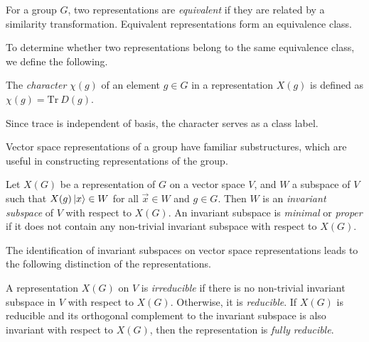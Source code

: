 \begin{definition}
    For a group $G$, two representations are \textit{equivalent} if they are related by a similarity transformation. Equivalent representations form an equivalence class.
\end{definition}

To determine whether two representations belong to the same equivalence class, we define the following.
\begin{definition}
    The \textit{character} $\chi(g)$ of an element $g\in G$ in a representation $X(g)$ is defined as $\chi(g) = \text{Tr}~D(g)$.
\end{definition}
Since trace is independent of basis, the character serves as a class label.

Vector space representations of a group have familiar substructures, which are useful in constructing representations of the group.
\begin{definition}
    Let $X(G)$ be a representation of $G$ on a vector space $V$, and $W$ a subspace of $V$ such that $X(g)\ket{x}\in W$ for all $\vec{x}\in W$ and $g\in G$. Then $W$ is an \textit{invariant subspace} of $V$ with respect to $X(G)$. An invariant subspace is \textit{minimal} or \textit{proper} if it does not contain any non-trivial invariant subspace with respect to $X(G)$.
\end{definition}

The identification of invariant subspaces on vector space representations leads to the following distinction of the representations.
\begin{definition}
    A representation $X(G)$ on $V$ is \textit{irreducible} if there is no non-trivial invariant subspace in $V$ with respect to $X(G)$. Otherwise, it is \textit{reducible}. If $X(G)$ is reducible and its orthogonal complement to the invariant subspace is also invariant with respect to $X(G)$, then the representation is \textit{fully reducible}.
\end{definition}


